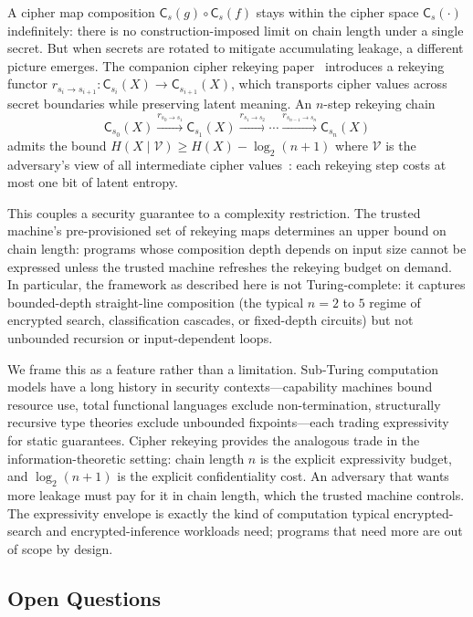 \documentclass[11pt]{article}
\theoremstyle{definition}
\theoremstyle{plain}
\theoremstyle{remark}
\newcommand{\cipherS}[2]{\mathsf{C}_{#2}(#1)}
\begin{document}
A cipher map composition $\cipherS{g}{s} \circ \cipherS{f}{s}$ stays
within the cipher space $\cipherS{\cdot}{s}$ indefinitely: there is no
construction-imposed limit on chain length under a single secret.  But
when secrets are rotated to mitigate accumulating leakage, a different
picture emerges.  The companion cipher rekeying
paper~\cite{towell2026rekeying} introduces a rekeying functor
$r_{s_i \to s_{i+1}} : \cipherS{X}{s_i} \to \cipherS{X}{s_{i+1}}$,
which transports cipher values across secret boundaries while preserving
latent meaning.  An $n$-step rekeying chain
\[
\cipherS{X}{s_0} \xrightarrow{r_{s_0 \to s_1}}
\cipherS{X}{s_1} \xrightarrow{r_{s_1 \to s_2}}
\cdots \xrightarrow{r_{s_{n-1} \to s_n}}
\cipherS{X}{s_n}
\]
admits the bound $H(X \mid \mathcal{V}) \geq H(X) - \log_2(n+1)$
where $\mathcal{V}$ is the adversary's view of all intermediate cipher
values~\cite[Thm.~7.1]{towell2026rekeying}: each rekeying step costs at
most one bit of latent entropy.

This couples a security guarantee to a complexity restriction.  The
trusted machine's pre-provisioned set of rekeying maps determines an
upper bound on chain length: programs whose composition depth depends
on input size cannot be expressed unless the trusted machine refreshes
the rekeying budget on demand.  In particular, the framework as
described here is not Turing-complete: it captures bounded-depth
straight-line composition (the typical $n = 2$ to $5$ regime of
encrypted search, classification cascades, or fixed-depth circuits) but
not unbounded recursion or input-dependent loops.

We frame this as a feature rather than a limitation.  Sub-Turing
computation models have a long history in security
contexts---capability machines bound resource use, total functional
languages exclude non-termination, structurally recursive type theories
exclude unbounded fixpoints---each trading expressivity for static
guarantees.  Cipher rekeying provides the analogous trade in the
information-theoretic setting: chain length $n$ is the explicit
expressivity budget, and $\log_2(n+1)$ is the explicit confidentiality
cost.  An adversary that wants more leakage must pay for it in chain
length, which the trusted machine controls.  The expressivity envelope
is exactly the kind of computation typical encrypted-search and
encrypted-inference workloads need; programs that need more are
out of scope by design.

\subsection{Open Questions}
\end{document}
